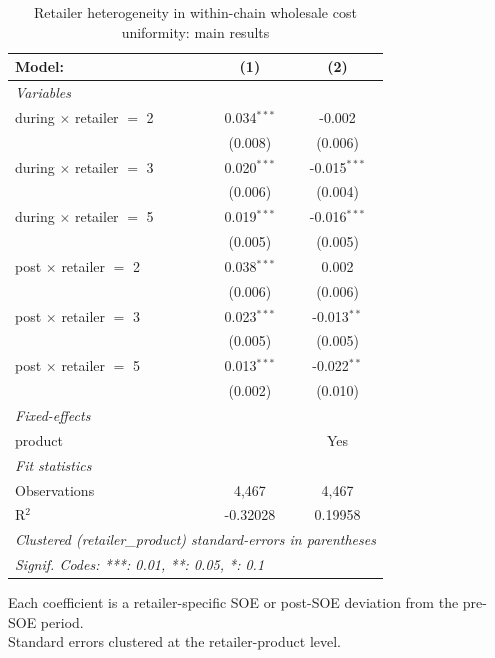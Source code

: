 
\begin{table}[htbp]
   \caption{\label{tab:uniformity_heterog_wholesale_main} Retailer heterogeneity in within-chain wholesale cost uniformity: main results}
   \centering
   \begin{tabular}{lcc}
      \tabularnewline \midrule \midrule
      Model:                          & (1)           & (2)\\  
      \midrule
      \emph{Variables}\\
      during $\times$ retailer $=$ 2  & 0.034$^{***}$ & -0.002\\   
                                      & (0.008)       & (0.006)\\   
      during $\times$ retailer $=$ 3  & 0.020$^{***}$ & -0.015$^{***}$\\   
                                      & (0.006)       & (0.004)\\   
      during $\times$ retailer $=$ 5  & 0.019$^{***}$ & -0.016$^{***}$\\   
                                      & (0.005)       & (0.005)\\   
      post $\times$ retailer $=$ 2    & 0.038$^{***}$ & 0.002\\   
                                      & (0.006)       & (0.006)\\   
      post $\times$ retailer $=$ 3    & 0.023$^{***}$ & -0.013$^{**}$\\   
                                      & (0.005)       & (0.005)\\   
      post $\times$ retailer $=$ 5    & 0.013$^{***}$ & -0.022$^{**}$\\   
                                      & (0.002)       & (0.010)\\   
      \midrule
      \emph{Fixed-effects}\\
      product                         &               & Yes\\  
      \midrule
      \emph{Fit statistics}\\
      Observations                    & 4,467         & 4,467\\  
      R$^2$                           & -0.32028      & 0.19958\\  
      \midrule \midrule
      \multicolumn{3}{l}{\emph{Clustered (retailer\_product) standard-errors in parentheses}}\\
      \multicolumn{3}{l}{\emph{Signif. Codes: ***: 0.01, **: 0.05, *: 0.1}}\\
   \end{tabular}
   
   \par \raggedright 
   Each coefficient is a retailer-specific SOE or post-SOE deviation from the pre-SOE period.\\
   Standard errors clustered at the retailer-product level.
\end{table}


